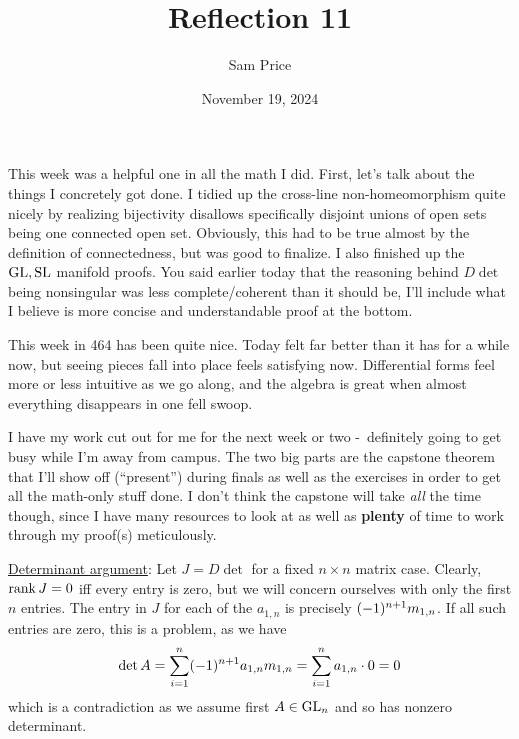\documentclass[12pt]{article}
\author{Sam Price}
\title{Reflection 11}
\date{November 19, 2024}
\begin{document}
\maketitle

This week was a helpful one in all the math I did.
First, let's talk about the things I concretely got done.
I tidied up the cross-line non-homeomorphism quite nicely by realizing bijectivity disallows specifically disjoint unions of open sets being one connected open set.
Obviously, this had to be true almost by the definition of connectedness, but was good to finalize.
I also finished up the $\operatorname{GL},\operatorname{SL}$ manifold proofs.
You said earlier today that the reasoning behind $D\det$ being nonsingular was less complete/coherent than it should be,
I'll include what I believe is more concise and understandable proof at the bottom.

This week in 464 has been quite nice. Today felt far better than it has for a while now, but seeing pieces fall into place feels satisfying now.
Differential forms feel more or less intuitive as we go along, and the algebra is great when almost everything disappears in one fell swoop.

I have my work cut out for me for the next week or two -\ definitely going to get busy while I'm away from campus.
The two big parts are the capstone theorem that I'll show off (``present'') during finals as well as the exercises in order to get all the math-only stuff done.
I don't think the capstone will take \emph{all} the time though, since I have many resources to look at as well as \textbf{plenty} of time to work through my proof(s)
meticulously.

\underline{Determinant argument}: Let $J = D\det$ for a fixed $n \times n$ matrix case.
Clearly, $\operatorname{rank} J = 0$ iff every entry is zero, but we will concern ourselves with only the first $n$ entries.
The entry in $J$ for each of the $a_{1,n}$ is precisely $\lparen-1\rparen^{n + 1}m_{1,n}$.
If all such entries are zero, this is a problem, as we have
\[ \det A = \sum_{i = 1}^{n}\lparen-1\rparen^{n + 1}a_{1,n}m_{1,n} = \sum_{i = 1}^{n}a_{1,n} \cdot 0 = 0 \]
which is a contradiction as we assume first $A \in \operatorname{GL}_{n}$ and so has nonzero determinant.
\end{document}
